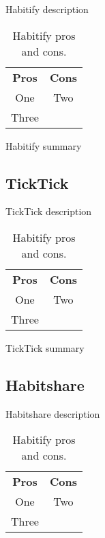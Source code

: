 Habitify description

\begin{table}[h!]
    \centering
    \begin{ctucolortab}
        \begin{tabular}{cc}
            \bfseries Pros & \bfseries Cons\\\Midrule
            One & Two\\
            Three & \\
        \end{tabular}
    \end{ctucolortab}
    \caption{Habitify pros and cons.}\label{tab:habitify-pros-cons}
\end{table}

Habitify summary


\subsection{TickTick}\label{subsec:ticktick}

TickTick description

\begin{table}[h!]
    \centering
    \begin{ctucolortab}
        \begin{tabular}{cc}
            \bfseries Pros & \bfseries Cons\\\Midrule
            One & Two\\
            Three & \\
        \end{tabular}
    \end{ctucolortab}
    \caption{Habitify pros and cons.}\label{tab:tickTick-pros-cons}
\end{table}

TickTick summary


\subsection{Habitshare}\label{subsec:habitshare}

Habitshare description

\begin{table}[h!]
    \centering
    \begin{ctucolortab}
        \begin{tabular}{cc}
            \bfseries Pros & \bfseries Cons\\\Midrule
            One & Two\\
            Three & \\
        \end{tabular}
    \end{ctucolortab}
    \caption{Habitify pros and cons.}\label{tab:habitshare-pros-cons}
\end{table}

